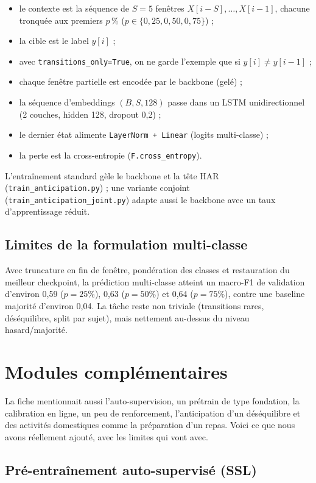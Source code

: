 \documentclass[a4paper,12pt]{report}
\begin{document}
\begin{itemize}
  \item le contexte est la séquence de $S=5$ fenêtres
  $X[i-S],\ldots,X[i-1]$, chacune tronquée aux premiers $p\,\%$
  ($p\in\{0{,}25,0{,}50,0{,}75\}$) ;
  \item la cible est le label $y[i]$ ;
  \item avec \texttt{transitions\_only=True}, on ne garde l'exemple que si
  $y[i]\neq y[i-1]$ ;
  \item chaque fenêtre partielle est encodée par le backbone (gelé) ;
  \item la séquence d'embeddings $(B,S,128)$ passe dans un LSTM
  unidirectionnel (2 couches, hidden 128, dropout 0,2) ;
  \item le dernier état alimente \texttt{LayerNorm + Linear} (logits
  multi-classe) ;
  \item la perte est la cross-entropie (\texttt{F.cross\_entropy}).
\end{itemize}

L'entraînement standard gèle le backbone et la tête HAR
(\texttt{train\_anticipation.py}) ; une variante conjoint
(\texttt{train\_anticipation\_joint.py}) adapte aussi le backbone avec un
taux d'apprentissage réduit.

\subsection{Limites de la formulation multi-classe}

Avec truncature en fin de fenêtre, pondération des classes et restauration
du meilleur checkpoint, la prédiction multi-classe atteint un macro-F1 de
validation d'environ 0,59 ($p=25\%$), 0,63 ($p=50\%$) et 0,64 ($p=75\%$),
contre une baseline majorité d'environ 0,04. La tâche reste non triviale
(transitions rares, déséquilibre, split par sujet), mais nettement au-dessus
du niveau hasard/majorité.

\section{Modules complémentaires}

La fiche mentionnait aussi l'auto-supervision, un prétrain de type fondation,
la calibration en ligne, un peu de renforcement, l'anticipation d'un déséquilibre
et des activités domestiques comme la préparation d'un repas. Voici ce que
nous avons réellement ajouté, avec les limites qui vont avec.

\subsection{Pré-entraînement auto-supervisé (SSL)}
\end{document}
